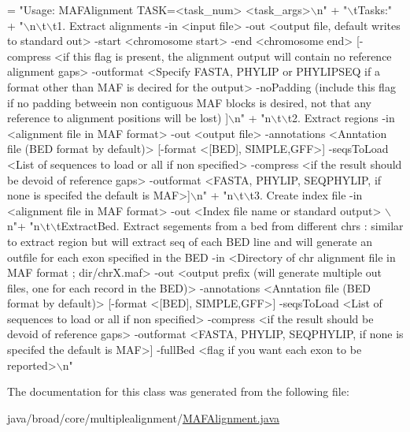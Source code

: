 \begin{DoxyCode}
= \textcolor{stringliteral}{"Usage: MAFAlignment TASK=<task\_num> <task\_args>\(\backslash\)n"} +
    \textcolor{stringliteral}{"\(\backslash\)tTasks:"} +
    \textcolor{stringliteral}{"\(\backslash\)n\(\backslash\)t\(\backslash\)t1. Extract alignments  -in <input file> -out <output file, default writes to standard out> 
       -start <chromosome start> -end <chromosome end> [-compress <if this flag is present, the alignment output will
       contain no reference alignment gaps> -outformat <Specify FASTA, PHYLIP or PHYLIPSEQ if a format other than
       MAF is decired for the output> -noPadding (include this flag if no padding betweein non contiguous MAF blocks
       is desired, not that any reference to alignment positions will be lost) ]\(\backslash\)n"} +
    \textcolor{stringliteral}{"n\(\backslash\)t\(\backslash\)t2. Extract regions -in <alignment file in MAF format> -out <output file> -annotations <Anntation
       file (BED format by default)> [-format <[BED], SIMPLE,GFF>] -seqsToLoad <List of sequences to load or all if
       non specified> -compress <if the result should be devoid of reference gaps> -outformat <FASTA, PHYLIP,
       SEQPHYLIP, if none is specifed the default is MAF>]\(\backslash\)n"} +
    \textcolor{stringliteral}{"n\(\backslash\)t\(\backslash\)t3. Create index file -in <alignment file in MAF format> -out <Index file name or standard output>
      \(\backslash\)n"}+
    \textcolor{stringliteral}{"n\(\backslash\)t\(\backslash\)tExtractBed. Extract segements from a bed from different chrs : similar to extract region but will
       extract seq of each BED line and will generate an outfile for each  exon specified in the BED   -in
       <Directory of chr alignment file in MAF format ; dir/chrX.maf> -out <output prefix (will generate multiple out
       files, one for each record in the BED)> -annotations <Anntation file (BED format by default)> [-format <[BED],
       SIMPLE,GFF>] -seqsToLoad <List of sequences to load or all if non specified> -compress <if the result should
       be devoid of reference gaps> -outformat <FASTA, PHYLIP, SEQPHYLIP, if none is specifed the default is MAF>] 
       -fullBed <flag if you want each exon to be reported>\(\backslash\)n"}
\end{DoxyCode}


The documentation for this class was generated from the following file\+:\begin{DoxyCompactItemize}
\item 
java/broad/core/multiplealignment/\hyperlink{_m_a_f_alignment_8java}{M\+A\+F\+Alignment.\+java}\end{DoxyCompactItemize}

